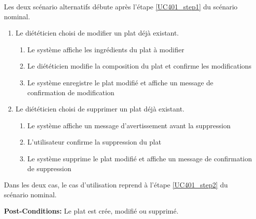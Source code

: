 Les deux scénario alternatifs débute après l'étape \ref{UC401_step1} du scénario nominal.
\begin{enumerate}
	\item Le diététicien choisi de modifier un plat déjà existant.
	\begin{enumerate}
		\item Le système affiche les ingrédients du plat à modifier
		\item Le diététicien modifie la composition du plat et confirme les modifications
		\item Le système enregistre le plat modifié et affiche un message de confirmation de modification
	\end{enumerate}
	\item Le diététicien choisi de supprimer un plat déjà existant.
	\begin{enumerate}
		\item Le système affiche un message d'avertissement avant la suppression
		\item L'utilisateur confirme la suppression du plat
		\item Le système supprime le plat modifié et affiche un message de confirmation de suppression
	\end{enumerate}
\end{enumerate}
Dans les deux cas, le cas d'utilisation reprend à l'étape \ref{UC401_step2} du scénario nominal.

\noindent \textbf{Post-Conditions:} Le plat est crée, modifié ou supprimé.


